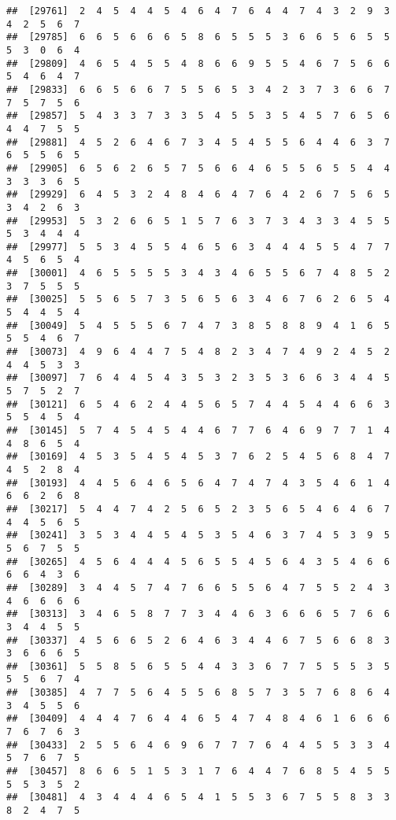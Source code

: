 \documentclass[
]{book}
\begin{document}
\begin{verbatim}
##  [29761]  2  4  5  4  4  5  4  6  4  7  6  4  4  7  4  3  2  9  3  4  2  5  6  7
##  [29785]  6  6  5  6  6  6  5  8  6  5  5  5  3  6  6  5  6  5  5  5  3  0  6  4
##  [29809]  4  6  5  4  5  5  4  8  6  6  9  5  5  4  6  7  5  6  6  5  4  6  4  7
##  [29833]  6  6  5  6  6  7  5  5  6  5  3  4  2  3  7  3  6  6  7  7  5  7  5  6
##  [29857]  5  4  3  3  7  3  3  5  4  5  5  3  5  4  5  7  6  5  6  4  4  7  5  5
##  [29881]  4  5  2  6  4  6  7  3  4  5  4  5  5  6  4  4  6  3  7  6  5  5  6  5
##  [29905]  6  5  6  2  6  5  7  5  6  6  4  6  5  5  6  5  5  4  4  3  3  3  6  5
##  [29929]  6  4  5  3  2  4  8  4  6  4  7  6  4  2  6  7  5  6  5  3  4  2  6  3
##  [29953]  5  3  2  6  6  5  1  5  7  6  3  7  3  4  3  3  4  5  5  5  3  4  4  4
##  [29977]  5  5  3  4  5  5  4  6  5  6  3  4  4  4  5  5  4  7  7  4  5  6  5  4
##  [30001]  4  6  5  5  5  5  3  4  3  4  6  5  5  6  7  4  8  5  2  3  7  5  5  5
##  [30025]  5  5  6  5  7  3  5  6  5  6  3  4  6  7  6  2  6  5  4  5  4  4  5  4
##  [30049]  5  4  5  5  5  6  7  4  7  3  8  5  8  8  9  4  1  6  5  5  5  4  6  7
##  [30073]  4  9  6  4  4  7  5  4  8  2  3  4  7  4  9  2  4  5  2  4  4  5  3  3
##  [30097]  7  6  4  4  5  4  3  5  3  2  3  5  3  6  6  3  4  4  5  5  7  5  2  7
##  [30121]  6  5  4  6  2  4  4  5  6  5  7  4  4  5  4  4  6  6  3  5  5  4  5  4
##  [30145]  5  7  4  5  4  5  4  4  6  7  7  6  4  6  9  7  7  1  4  4  8  6  5  4
##  [30169]  4  5  3  5  4  5  4  5  3  7  6  2  5  4  5  6  8  4  7  4  5  2  8  4
##  [30193]  4  4  5  6  4  6  5  6  4  7  4  7  4  3  5  4  6  1  4  6  6  2  6  8
##  [30217]  5  4  4  7  4  2  5  6  5  2  3  5  6  5  4  6  4  6  7  4  4  5  6  5
##  [30241]  3  5  3  4  4  5  4  5  3  5  4  6  3  7  4  5  3  9  5  5  6  7  5  5
##  [30265]  4  5  6  4  4  4  5  6  5  5  4  5  6  4  3  5  4  6  6  6  6  4  3  6
##  [30289]  3  4  4  5  7  4  7  6  6  5  5  6  4  7  5  5  2  4  3  4  6  6  6  6
##  [30313]  3  4  6  5  8  7  7  3  4  4  6  3  6  6  6  5  7  6  6  3  4  4  5  5
##  [30337]  4  5  6  6  5  2  6  4  6  3  4  4  6  7  5  6  6  8  3  3  6  6  6  5
##  [30361]  5  5  8  5  6  5  5  4  4  3  3  6  7  7  5  5  5  3  5  5  5  6  7  4
##  [30385]  4  7  7  5  6  4  5  5  6  8  5  7  3  5  7  6  8  6  4  3  4  5  5  6
##  [30409]  4  4  4  7  6  4  4  6  5  4  7  4  8  4  6  1  6  6  6  7  6  7  6  3
##  [30433]  2  5  5  6  4  6  9  6  7  7  7  6  4  4  5  5  3  3  4  5  7  6  7  5
##  [30457]  8  6  6  5  1  5  3  1  7  6  4  4  7  6  8  5  4  5  5  5  5  3  5  2
##  [30481]  4  3  4  4  4  6  5  4  1  5  5  3  6  7  5  5  8  3  3  8  2  4  7  5

\end{verbatim}
\end{document}
